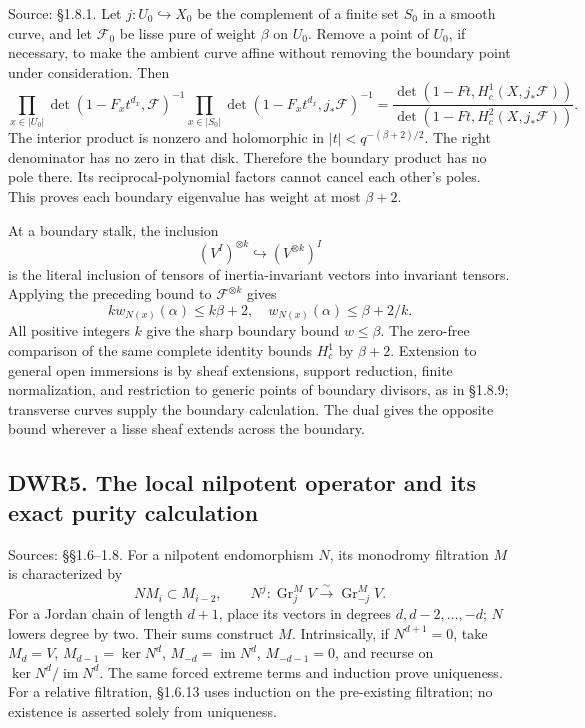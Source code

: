 Source: §1.8.1. Let \(j:U_0\hookrightarrow X_0\) be the complement of a
finite set \(S_0\) in a smooth curve, and let \(\mathcal F_0\) be lisse
pure of weight \(\beta\) on \(U_0\). Remove a point of \(U_0\), if
necessary, to make the ambient curve affine without removing the
boundary point under consideration. Then \[
\prod_{x\in|U_0|}\det(1-F_xt^{d_x},\mathcal F)^{-1}
\prod_{x\in|S_0|}\det(1-F_xt^{d_x},j_*\mathcal F)^{-1}
=\frac{\det(1-Ft,H_c^1(X,j_*\mathcal F))}
{\det(1-Ft,H_c^2(X,j_*\mathcal F))}.
\tag{DWR4.1}
\] The interior product is nonzero and holomorphic in
\(|t|<q^{-(\beta+2)/2}\). The right denominator has no zero in that
disk. Therefore the boundary product has no pole there. Its
reciprocal-polynomial factors cannot cancel each other's poles. This
proves each boundary eigenvalue has weight at most \(\beta+2\).

At a boundary stalk, the inclusion \[
(V^I)^{\otimes k}\hookrightarrow(V^{\otimes k})^I
\tag{DWR4.2}
\] is the literal inclusion of tensors of inertia-invariant vectors into
invariant tensors. Applying the preceding bound to
\(\mathcal F^{\otimes k}\) gives \[
kw_{N(x)}(\alpha)\le k\beta+2,
\quad w_{N(x)}(\alpha)\le\beta+2/k.
\tag{DWR4.3}
\] All positive integers \(k\) give the sharp boundary bound
\(w\le\beta\). The zero-free comparison of the same complete identity
bounds \(H_c^1\) by \(\beta+2\). Extension to general open immersions is
by sheaf extensions, support reduction, finite normalization, and
restriction to generic points of boundary divisors, as in §1.8.9;
transverse curves supply the boundary calculation. The dual gives the
opposite bound wherever a lisse sheaf extends across the boundary.

\subsection{DWR5. The local nilpotent operator and its exact purity
calculation}\label{dwr5.-the-local-nilpotent-operator-and-its-exact-purity-calculation}

Sources: §§1.6--1.8. For a nilpotent endomorphism \(N\), its monodromy
filtration \(M\) is characterized by \[
NM_i\subset M_{i-2},\qquad
N^j:\operatorname{Gr}_j^M V\xrightarrow{\sim}\operatorname{Gr}_{-j}^M V.
\tag{DWR5.1}
\] For a Jordan chain of length \(d+1\), place its vectors in degrees
\(d,d-2,\ldots,-d\); \(N\) lowers degree by two. Their sums construct
\(M\). Intrinsically, if \(N^{d+1}=0\), take \(M_d=V\),
\(M_{d-1}=\ker N^d\), \(M_{-d}=\operatorname{im}N^d\), \(M_{-d-1}=0\),
and recurse on \(\ker N^d/\operatorname{im}N^d\). The same forced
extreme terms and induction prove uniqueness. For a relative filtration,
§1.6.13 uses induction on the pre-existing filtration; no existence is
asserted solely from uniqueness.

